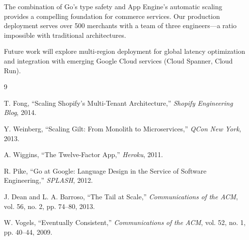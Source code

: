 \documentclass[11pt,twocolumn]{article}
\begin{document}
The combination of Go's type safety and App Engine's automatic scaling provides a compelling foundation for commerce services. Our production deployment serves over 500 merchants with a team of three engineers—a ratio impossible with traditional architectures.

Future work will explore multi-region deployment for global latency optimization and integration with emerging Google Cloud services (Cloud Spanner, Cloud Run).

\begin{thebibliography}{9}

T. Fong, ``Scaling Shopify's Multi-Tenant Architecture,'' \textit{Shopify Engineering Blog}, 2014.

Y. Weinberg, ``Scaling Gilt: From Monolith to Microservices,'' \textit{QCon New York}, 2013.

A. Wiggins, ``The Twelve-Factor App,'' \textit{Heroku}, 2011.

R. Pike, ``Go at Google: Language Design in the Service of Software Engineering,'' \textit{SPLASH}, 2012.

J. Dean and L. A. Barroso, ``The Tail at Scale,'' \textit{Communications of the ACM}, vol. 56, no. 2, pp. 74--80, 2013.

W. Vogels, ``Eventually Consistent,'' \textit{Communications of the ACM}, vol. 52, no. 1, pp. 40--44, 2009.

\end{thebibliography}
\end{document}
